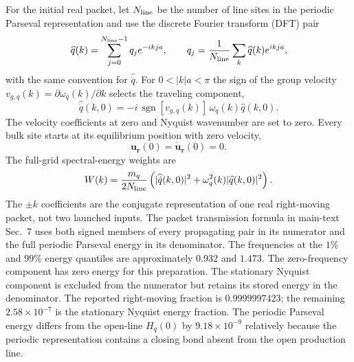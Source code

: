 \documentclass[10pt,aps,onecolumn,notitlepage,nofootinbib]{revtex4-2}
\begin{document}
For the initial real packet, let $N_{\rm line}$ be the number of line sites in the periodic Parseval representation and use the discrete Fourier transform (DFT) pair
\begin{equation}
 \widehat q(k)=\sum_{j=0}^{N_{\rm line}-1}q_j e^{-ikja},
 \qquad
 q_j=\frac{1}{N_{\rm line}}\sum_k\widehat q(k)e^{ikja},
 \label{eq:s7-line-dft}
\end{equation}
with the same convention for $\widehat{\dot q}$. For $0<|k|a<\pi$ the sign of the group velocity $v_{g,q}(k)=\partial\omega_q(k)/\partial k$ selects the traveling component,
\begin{equation*}
 \widehat{\dot q}(k,0)=-i\,\operatorname{sgn}[v_{g,q}(k)]\,\omega_q(k)\widehat q(k,0).
 \tag{SM5Cb}\label{eq:s7-packet-velocity}
\end{equation*}
The velocity coefficients at zero and Nyquist wavenumber are set to zero. Every bulk site starts at its equilibrium position with zero velocity,
\begin{equation*}
 \bm u_{\bm r}(0)=\dot{\bm u}_{\bm r}(0)=0.
 \tag{SM5Cc}\label{eq:s7-unexcited-bulk}
\end{equation*}
The full-grid spectral-energy weights are
\begin{equation}
 W(k)=\frac{m_q}{2N_{\rm line}}\left(|\widehat{\dot q}(k,0)|^2+\omega_q^2(k)|\widehat q(k,0)|^2\right).
 \label{eq:sm-packet-weight}
\end{equation}
The $\pm k$ coefficients are the conjugate representation of one real right-moving packet, not two launched inputs. The packet transmission formula in main-text Sec.~7 uses both signed members of every propagating pair in its numerator and the full periodic Parseval energy in its denominator. The frequencies at the $1\%$ and $99\%$ energy quantiles are approximately $0.932$ and $1.473$. The zero-frequency component has zero energy for this preparation. The stationary Nyquist component is excluded from the numerator but retains its stored energy in the denominator. The reported right-moving fraction is $0.9999997423$; the remaining $2.58\times10^{-7}$ is the stationary Nyquist energy fraction. The periodic Parseval energy differs from the open-line $H_q(0)$ by $9.18\times10^{-9}$ relatively because the periodic representation contains a closing bond absent from the open production line.
\end{document}
